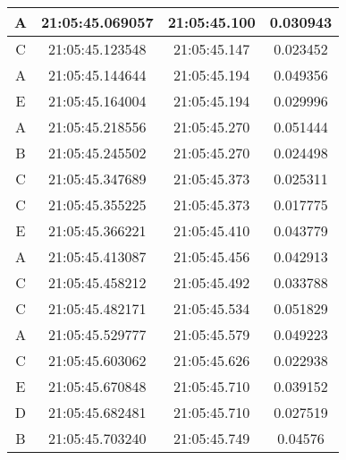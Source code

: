 \begin{longtable}{|ccc|c|}
    \multicolumn{1}{|c|}{A}    & \multicolumn{1}{c|}{21:05:45.069057} & 21:05:45.100       & 0.030943      \\ \hline
    \multicolumn{1}{|c|}{C}    & \multicolumn{1}{c|}{21:05:45.123548} & 21:05:45.147       & 0.023452      \\ \hline
    \multicolumn{1}{|c|}{A}    & \multicolumn{1}{c|}{21:05:45.144644} & 21:05:45.194       & 0.049356      \\ \hline
    \multicolumn{1}{|c|}{E}    & \multicolumn{1}{c|}{21:05:45.164004} & 21:05:45.194       & 0.029996      \\ \hline
    \multicolumn{1}{|c|}{A}    & \multicolumn{1}{c|}{21:05:45.218556} & 21:05:45.270       & 0.051444      \\ \hline
    \multicolumn{1}{|c|}{B}    & \multicolumn{1}{c|}{21:05:45.245502} & 21:05:45.270       & 0.024498      \\ \hline
    \multicolumn{1}{|c|}{C}    & \multicolumn{1}{c|}{21:05:45.347689} & 21:05:45.373       & 0.025311      \\ \hline
    \multicolumn{1}{|c|}{C}    & \multicolumn{1}{c|}{21:05:45.355225} & 21:05:45.373       & 0.017775      \\ \hline
    \multicolumn{1}{|c|}{E}    & \multicolumn{1}{c|}{21:05:45.366221} & 21:05:45.410       & 0.043779      \\ \hline
    \multicolumn{1}{|c|}{A}    & \multicolumn{1}{c|}{21:05:45.413087} & 21:05:45.456       & 0.042913      \\ \hline
    \multicolumn{1}{|c|}{C}    & \multicolumn{1}{c|}{21:05:45.458212} & 21:05:45.492       & 0.033788      \\ \hline
    \multicolumn{1}{|c|}{C}    & \multicolumn{1}{c|}{21:05:45.482171} & 21:05:45.534       & 0.051829      \\ \hline
    \multicolumn{1}{|c|}{A}    & \multicolumn{1}{c|}{21:05:45.529777} & 21:05:45.579       & 0.049223      \\ \hline
    \multicolumn{1}{|c|}{C}    & \multicolumn{1}{c|}{21:05:45.603062} & 21:05:45.626       & 0.022938      \\ \hline
    \multicolumn{1}{|c|}{E}    & \multicolumn{1}{c|}{21:05:45.670848} & 21:05:45.710       & 0.039152      \\ \hline
    \multicolumn{1}{|c|}{D}    & \multicolumn{1}{c|}{21:05:45.682481} & 21:05:45.710       & 0.027519      \\ \hline
    \multicolumn{1}{|c|}{B}    & \multicolumn{1}{c|}{21:05:45.703240} & 21:05:45.749       & 0.04576       \\ \hline

\end{longtable}
